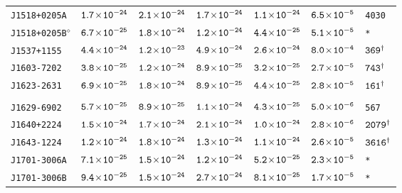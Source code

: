 \begin{longtable}{l | c | c | c | c | c | l}
\scriptsize{\tt{J1518+0205A}} & \scriptsize{$\tt{1.7\!\times\!10^{-24}}$} & \scriptsize{$\tt{2.1\!\times\!10^{-24}}$} & \scriptsize{$\tt{1.7\!\times\!10^{-24}}$} &\scriptsize{$\tt{1.1\!\times\!10^{-24}}$} & \scriptsize{$\tt{6.5\!\times\!10^{-5}}$} & \scriptsize{\tt{4030}} \\[-16pt] 
\scriptsize{\tt{J1518+0205B}$^{\diamond}$} & \scriptsize{$\tt{6.7\!\times\!10^{-25}}$} &
\scriptsize{$\tt{1.8\!\times\!10^{-24}}$} & \scriptsize{$\tt{1.2\!\times\!10^{-24}}$} & \scriptsize{$\tt{4.4\!\times\!10^{-25}}$}
& \scriptsize{$\tt{5.1\!\times\!10^{-5}}$} & \scriptsize{\tt{*}} \\[-16pt] 
\scriptsize{\tt{J1537+1155}} & \scriptsize{$\tt{4.4\!\times\!10^{-24}}$} & \scriptsize{$\tt{1.2\!\times\!10^{-23}}$} & \scriptsize{$\tt{4.9\!\times\!10^{-24}}$} & \scriptsize{$\tt{2.6\!\times\!10^{-24}}$} & \scriptsize{$\tt{8.0\!\times\!10^{-4}}$} & \scriptsize{$\tt{369^{\dagger}}$} \\[-16pt] 
\scriptsize{\tt{J1603-7202}} & \scriptsize{$\tt{3.8\!\times\!10^{-25}}$} & \scriptsize{$\tt{1.2\!\times\!10^{-24}}$} & \scriptsize{$\tt{8.9\!\times\!10^{-25}}$} & \scriptsize{$\tt{3.2\!\times\!10^{-25}}$} & \scriptsize{$\tt{2.7\!\times\!10^{-5}}$} & \scriptsize{$\tt{743^{\dagger}}$} \\[-16pt] 
\scriptsize{\tt{J1623-2631}} & \scriptsize{$\tt{6.9\!\times\!10^{-25}}$} & \scriptsize{$\tt{1.8\!\times\!10^{-24}}$} & \scriptsize{$\tt{8.9\!\times\!10^{-25}}$} & \scriptsize{$\tt{4.4\!\times\!10^{-25}}$} & \scriptsize{$\tt{2.8\!\times\!10^{-5}}$} & \scriptsize{$\tt{161^{\dagger}}$} \\[-16pt] 
\\[-20pt] 
\scriptsize{\tt{J1629-6902}} & \scriptsize{$\tt{5.7\!\times\!10^{-25}}$} & \scriptsize{$\tt{8.9\!\times\!10^{-25}}$} & \scriptsize{$\tt{1.1\!\times\!10^{-24}}$} &\scriptsize{$\tt{4.3\!\times\!10^{-25}}$} & \scriptsize{$\tt{5.0\!\times\!10^{-6}}$} & \scriptsize{\tt{567}} \\[-16pt] 
\scriptsize{\tt{J1640+2224}} & \scriptsize{$\tt{1.5\!\times\!10^{-24}}$} & \scriptsize{$\tt{1.7\!\times\!10^{-24}}$} & \scriptsize{$\tt{2.1\!\times\!10^{-24}}$} & \scriptsize{$\tt{1.0\!\times\!10^{-24}}$} & \scriptsize{$\tt{2.8\!\times\!10^{-6}}$} & \scriptsize{$\tt{2079^{\dagger}}$} \\[-16pt] 
\scriptsize{\tt{J1643-1224}} & \scriptsize{$\tt{1.2\!\times\!10^{-24}}$} & \scriptsize{$\tt{1.8\!\times\!10^{-24}}$} & \scriptsize{$\tt{1.3\!\times\!10^{-24}}$} & \scriptsize{$\tt{1.1\!\times\!10^{-24}}$} & \scriptsize{$\tt{2.6\!\times\!10^{-5}}$} & \scriptsize{$\tt{3616^{\dagger}}$} \\[-16pt] 
\scriptsize{\tt{J1701-3006A}} & \scriptsize{$\tt{7.1\!\times\!10^{-25}}$} & \scriptsize{$\tt{1.5\!\times\!10^{-24}}$} & \scriptsize{$\tt{1.2\!\times\!10^{-24}}$} & \scriptsize{$\tt{5.2\!\times\!10^{-25}}$} & \scriptsize{$\tt{2.3\!\times\!10^{-5}}$} & \scriptsize{\tt{*}} \\[-16pt] 
\scriptsize{\tt{J1701-3006B}} & \scriptsize{$\tt{9.4\!\times\!10^{-25}}$} & \scriptsize{$\tt{1.5\!\times\!10^{-24}}$} & \scriptsize{$\tt{2.7\!\times\!10^{-24}}$} & \scriptsize{$\tt{8.1\!\times\!10^{-25}}$} & \scriptsize{$\tt{1.7\!\times\!10^{-5}}$} & \scriptsize{\tt{*}} \\[-16pt] 

\end{longtable}
